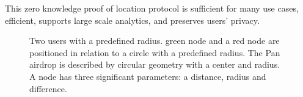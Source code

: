 \documentclass{article}
\begin{document}
This zero knowledge proof of location protocol is sufficient for many use cases, efficient, supports large scale analytics, and preserves users' privacy.

\begin{figure}
  \centering
  \def\svgwidth{\columnwidth}
  
\caption{Two users with a predefined radius. green node and a red node are positioned in relation to a circle with a predefined radius. The Pan airdrop is described by circular geometry with a center and radius. A node has three significant parameters: a distance, radius and difference.}
\label{fig-rangeproof}
\end{figure}

\end{document}
